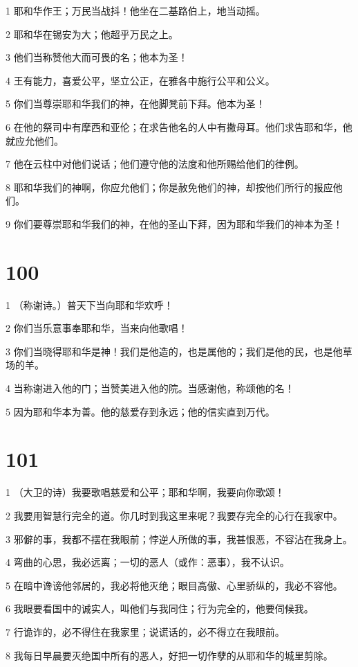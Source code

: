 \par 1 耶和华作王；万民当战抖！他坐在二基路伯上，地当动摇。
\par 2 耶和华在锡安为大；他超乎万民之上。
\par 3 他们当称赞他大而可畏的名；他本为圣！
\par 4 王有能力，喜爱公平，坚立公正，在雅各中施行公平和公义。
\par 5 你们当尊崇耶和华我们的神，在他脚凳前下拜。他本为圣！
\par 6 在他的祭司中有摩西和亚伦；在求告他名的人中有撒母耳。他们求告耶和华，他就应允他们。
\par 7 他在云柱中对他们说话；他们遵守他的法度和他所赐给他们的律例。
\par 8 耶和华我们的神啊，你应允他们；你是赦免他们的神，却按他们所行的报应他们。
\par 9 你们要尊崇耶和华我们的神，在他的圣山下拜，因为耶和华我们的神本为圣！

\chapter{100}

\par 1 （称谢诗。）普天下当向耶和华欢呼！
\par 2 你们当乐意事奉耶和华，当来向他歌唱！
\par 3 你们当晓得耶和华是神！我们是他造的，也是属他的；我们是他的民，也是他草场的羊。
\par 4 当称谢进入他的门；当赞美进入他的院。当感谢他，称颂他的名！
\par 5 因为耶和华本为善。他的慈爱存到永远；他的信实直到万代。

\chapter{101}

\par 1 （大卫的诗）我要歌唱慈爱和公平；耶和华啊，我要向你歌颂！
\par 2 我要用智慧行完全的道。你几时到我这里来呢？我要存完全的心行在我家中。
\par 3 邪僻的事，我都不摆在我眼前；悖逆人所做的事，我甚恨恶，不容沾在我身上。
\par 4 弯曲的心思，我必远离；一切的恶人（或作：恶事），我不认识。
\par 5 在暗中谗谤他邻居的，我必将他灭绝；眼目高傲、心里骄纵的，我必不容他。
\par 6 我眼要看国中的诚实人，叫他们与我同住；行为完全的，他要伺候我。
\par 7 行诡诈的，必不得住在我家里；说谎话的，必不得立在我眼前。
\par 8 我每日早晨要灭绝国中所有的恶人，好把一切作孽的从耶和华的城里剪除。

